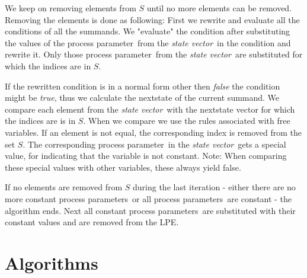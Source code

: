 \index{}\documentclass[a4paper,10pt]{article}
\theoremstyle{plain}
\theoremstyle{definition}
\newcommand{\pp}{process parameter}
\newcommand{\pps}{process parameters}
\newcommand{\ti}{\textit}
\newcommand{\sv}{\textit{state vector}}
\begin{document}
We keep on removing elements from $S$ until no more elements can be removed. Removing the elements is done as following:
First we rewrite and evaluate all the conditions of all the summands. We "evaluate" the condition after substituting the values of the \pp\ from the \sv\ in the condition and rewrite it. Only those \pp\ from the \sv\ are substituted for which the indices are in $S$. 

If the rewritten condition is in a normal form other then \ti{false} the condition might be \ti{true}, thus we calculate the nextstate of the current summand.  We compare each element from the \sv\ with the nextstate vector for which the indices are is in $S$. When we compare we use the rules associated with free variables. If an element is not equal, the corresponding index is removed from the set $S$. The corresponding \pp\ in the \sv\ gets a special value, for indicating that the variable is not constant. Note: When comparing these special values with other variables, these always yield false. 

If no elements are removed from $S$ during the last iteration - either there are no more constant \pps\ or all \pps\ are constant - the algorithm ends. Next all constant \pps\ are substituted with their constant values and are removed from the LPE. 

\newpage
\section{Algorithms}
\end{document}
